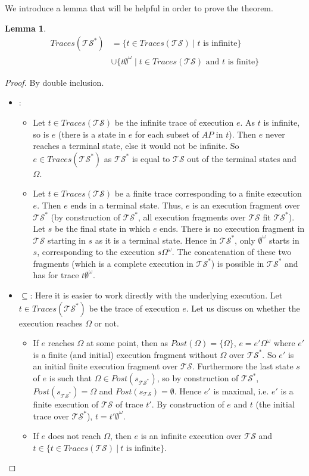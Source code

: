 \documentclass[11pt,a4paper]{article}
\def\ts{\mathcal{TS}}
\def\tss{\mathcal{TS^*}}
\def\traces{\mathit{Traces}}
\newtheorem*{lemma}{Lemma}
\begin{document}
\begin{Answer}
\Question%
We introduce a lemma that will be helpful in order to prove the theorem.
\begin{lemma}
  \begin{align*}
    \traces(\tss) &= \{t\in\traces(\ts) \mid t\text{ is infinite}\}\\
    &\cup\{t\emptyset^\omega \mid t\in\traces(\ts)\text{ and $t$ is finite}\}
  \end{align*}
\end{lemma}
\begin{proof}
  By double inclusion.\\
  \begin{itemize}
	  \item {}: %
	  \begin{itemize}
		  \item Let $t\in \traces(\ts)$ be the infinite trace of execution $e$. As $t$ is infinite, so is $e$ (there is a state in $e$ for each subset of $AP$ in $t$).
		  Then $e$ never reaches a terminal state, else it would not be infinite. So $e\in \traces(\tss)$ as $\tss$ is equal to $\ts$ out of the terminal states and $\Omega$.
		  \item Let $t\in \traces(\ts)$ be a finite trace corresponding to a finite execution $e$. Then $e$ ends in a terminal state. Thus, $e$ is an execution fragment over $\tss$
		  (by construction of $\tss$, all execution fragments over $\ts$ fit $\tss$). Let $s$ be the final state in which $e$ ends. There is no execution fragment in $\ts$ starting in $s$ as it is a terminal state.
		  Hence in $\tss$, only $\emptyset^\omega$ starts in $s$, corresponding to the execution $s\Omega^\omega$. The concatenation of these two fragments (which is a complete execution in $\tss$) is possible in $\tss$ and has for trace $t\emptyset^\omega$.
	  \end{itemize}
	  \item $\subseteq$: Here it is easier to work directly with the underlying execution.
	  Let $t\in \traces(\tss)$ be the trace of execution $e$. Let us discuss on whether the execution reaches $\Omega$ or not.
	  \begin{itemize}
		  \item If $e$ reaches $\Omega$ at some point, then as $Post(\Omega) = \{\Omega\}$, $e=e'\Omega^\omega$ where $e'$ is a finite (and initial) execution fragment without $\Omega$ over $\tss$.
		  So $e'$ is an initial finite execution fragment over $\ts$. Furthermore the last state $s$ of $e$ is such that $\Omega \in Post(s_{\tss})$, so by construction of $\tss$, $Post(s_{\tss})=\Omega$ and
		  $Post(s_{\ts})=\emptyset$. Hence $e'$ is maximal, i.e. $e'$ is a finite execution of $\ts$ of trace $t'$. By construction of $e$ and $t$ (the initial trace over $\tss$), $t = t'\emptyset^\omega$.
		  \item If $e$ does not reach $\Omega$, then $e$ is an infinite execution over $\ts$ and $t\in  \{t\in\traces(\ts)~|~t\text{ is infinite}\}$.
	  \end{itemize}
  \end{itemize}
\end{proof}



\end{Answer}
\end{document}
